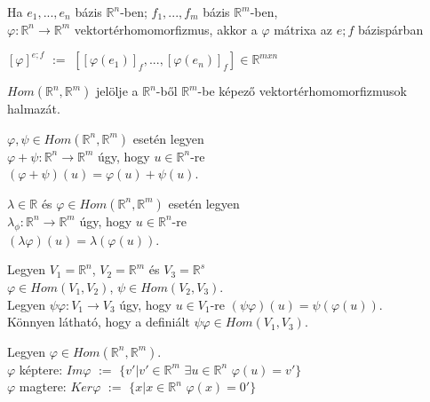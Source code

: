 	\begin{frame}
		\begin{tcolorbox}[title={Def.: Vektortérhomomorfizmus mátrixa}]
 			Ha $e_1, ..., e_n$ bázis $\mathbb{R}^n$-ben; $f_1, ..., f_m$ bázis $\mathbb{R}^m$-ben,\\
 			$\varphi : \mathbb{R}^n \rightarrow \mathbb{R}^m$ vektortérhomomorfizmus, akkor a $\varphi$ mátrixa az $e; f$ bázispárban\\
 			\mmedskip

			$[{\varphi}]^{e;f}$ $:=$ $[[{\varphi}(e_1)]_f, ..., [{\varphi}(e_n)]_f] \in \mathbb{R}^{m x n}$
		\end{tcolorbox}	
		
		\begin{tcolorbox}[title={Def.: Vektortérhomomorfizmusok halmaza}]
 			$Hom(\mathbb{R}^n, \mathbb{R}^m)$ jelölje a $\mathbb{R}^n$-ből $\mathbb{R}^m$-be képező vektortérhomomorfizmusok halmazát.\\
 			\mmedskip
 			
			$\varphi, \psi \in Hom(\mathbb{R}^n, \mathbb{R}^m)$ esetén legyen\\
			$\varphi + \psi : \mathbb{R}^n \rightarrow \mathbb{R}^m$ úgy, hogy $u \in \mathbb{R}^n$-re\\
			$(\varphi + \psi)(u) = \varphi(u) + \psi(u)$. \\
			\mmedskip
						
			${\lambda} \in \mathbb{R}$ és $\varphi \in Hom(\mathbb{R}^n, \mathbb{R}^m)$ esetén legyen\\
			${\lambda}_{\phi} : \mathbb{R}^n \rightarrow \mathbb{R}^m$ úgy, hogy $u \in \mathbb{R}^n$-re\\
			$({\lambda}\varphi)(u) = {\lambda}(\varphi(u))$.
		\end{tcolorbox}	
		
		\begin{tcolorbox}[title={Def.: Vektortérhomomorfizmus mátrixa}]
 			Legyen $V_1 = \mathbb{R}^n$, $V_2 = \mathbb{R}^m$ és $V_3 = \mathbb{R}^s$\\
 			$\varphi \in Hom(V_1, V_2)$, $\psi \in Hom(V_2, V_3)$.\\
 			Legyen ${\psi}\varphi : V_1 \rightarrow V_3$ úgy, hogy $u \in V_1$-re $({\psi}{\varphi})(u) = \psi(\varphi(u))$.\\
			Könnyen látható, hogy a definiált ${\psi}{\varphi} \in Hom(V_1, V_3)$.
		\end{tcolorbox}	
		
		\begin{tcolorbox}[title={Def.: Képtér, magtér}]
 			 Legyen $\varphi \in Hom(\mathbb{R}^n, \mathbb{R}^m)$.\\
 			 
 			 $\varphi$ képtere: $Im \varphi$ $:=$ $\{v' | v' \in \mathbb{R}^m$ ${\exists}u \in \mathbb{R}^n$ $\varphi(u) = v'\}$\\
 			 $\varphi$ magtere: $Ker \varphi$ $:=$ $\{ x | x \in \mathbb{R}^n$ ${\varphi}(x) = 0'\}$
		\end{tcolorbox}	
	\end{frame}
	
